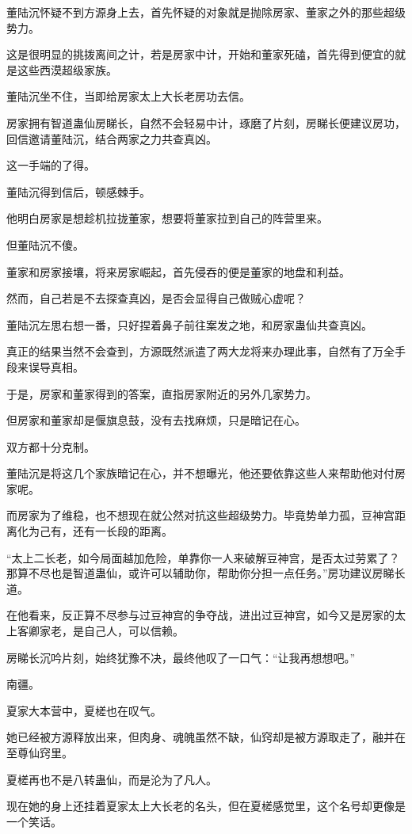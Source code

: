 \begin{this_body}
董陆沉怀疑不到方源身上去，首先怀疑的对象就是抛除房家、董家之外的那些超级势力。

这是很明显的挑拨离间之计，若是房家中计，开始和董家死磕，首先得到便宜的就是这些西漠超级家族。

董陆沉坐不住，当即给房家太上大长老房功去信。

房家拥有智道蛊仙房睇长，自然不会轻易中计，琢磨了片刻，房睇长便建议房功，回信邀请董陆沉，结合两家之力共查真凶。

这一手端的了得。

董陆沉得到信后，顿感棘手。

他明白房家是想趁机拉拢董家，想要将董家拉到自己的阵营里来。

但董陆沉不傻。

董家和房家接壤，将来房家崛起，首先侵吞的便是董家的地盘和利益。

然而，自己若是不去探查真凶，是否会显得自己做贼心虚呢？

董陆沉左思右想一番，只好捏着鼻子前往案发之地，和房家蛊仙共查真凶。

真正的结果当然不会查到，方源既然派遣了两大龙将来办理此事，自然有了万全手段来误导真相。

于是，房家和董家得到的答案，直指房家附近的另外几家势力。

但房家和董家却是偃旗息鼓，没有去找麻烦，只是暗记在心。

双方都十分克制。

董陆沉是将这几个家族暗记在心，并不想曝光，他还要依靠这些人来帮助他对付房家呢。

而房家为了维稳，也不想现在就公然对抗这些超级势力。毕竟势单力孤，豆神宫距离化为己有，还有一长段的距离。

“太上二长老，如今局面越加危险，单靠你一人来破解豆神宫，是否太过劳累了？那算不尽也是智道蛊仙，或许可以辅助你，帮助你分担一点任务。”房功建议房睇长道。

在他看来，反正算不尽参与过豆神宫的争夺战，进出过豆神宫，如今又是房家的太上客卿家老，是自己人，可以信赖。

房睇长沉吟片刻，始终犹豫不决，最终他叹了一口气：“让我再想想吧。”

南疆。

夏家大本营中，夏槎也在叹气。

她已经被方源释放出来，但肉身、魂魄虽然不缺，仙窍却是被方源取走了，融并在至尊仙窍里。

夏槎再也不是八转蛊仙，而是沦为了凡人。

现在她的身上还挂着夏家太上大长老的名头，但在夏槎感觉里，这个名号却更像是一个笑话。


\end{this_body}
